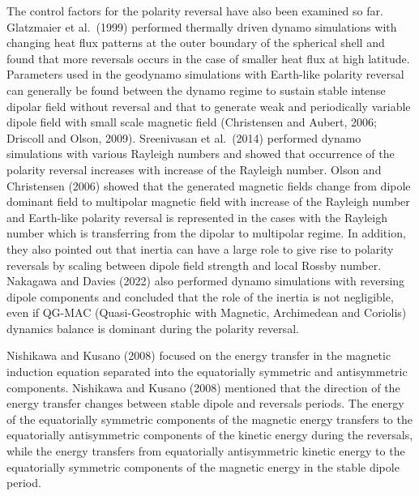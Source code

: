 The control factors for the polarity reversal have also been examined so far.
Glatzmaier et al.\ (1999) %
performed thermally driven dynamo simulations with changing heat flux patterns at the outer boundary of the spherical shell and found that more reversals occurs in the case of smaller heat flux at high latitude. 
Parameters used in the geodynamo simulations with Earth-like polarity reversal can generally be found between the dynamo regime to sustain stable intense dipolar field without reversal and that to generate weak and periodically variable dipole field with small scale magnetic field (Christensen and Aubert, 2006; 
Driscoll and Olson, 2009). %
Sreenivasan et al.\ (2014) %
performed dynamo simulations with various Rayleigh numbers and showed that occurrence of the polarity reversal increases with increase of the Rayleigh number. 
Olson and Christensen (2006) %
showed that the generated magnetic fields change from dipole dominant field to multipolar magnetic field with increase of the Rayleigh number and Earth-like polarity reversal is represented in the cases with the Rayleigh number which is transferring from the dipolar to multipolar regime. 
In addition, they also pointed out that inertia can have a large role to give rise to polarity reversals by scaling between dipole field strength and local Rossby number.
Nakagawa and Davies (2022) 
also performed dynamo simulations with reversing dipole components and concluded that the role of the inertia is not negligible, even if QG-MAC (Quasi-Geostrophic with Magnetic, Archimedean and Coriolis) dynamics balance is dominant during the polarity reversal.

Nishikawa and Kusano (2008) 
focused on the energy transfer in the magnetic induction equation separated into the equatorially symmetric and antisymmetric components. 
Nishikawa and Kusano (2008) mentioned that the direction of the energy transfer changes between stable dipole and reversals periods. 
The energy of the equatorially symmetric components of the magnetic energy transfers to the equatorially antisymmetric components of the kinetic energy during the reversals, while the energy transfers from equatorially antisymmetric kinetic energy to the equatorially symmetric components of the magnetic energy in the stable dipole period.

